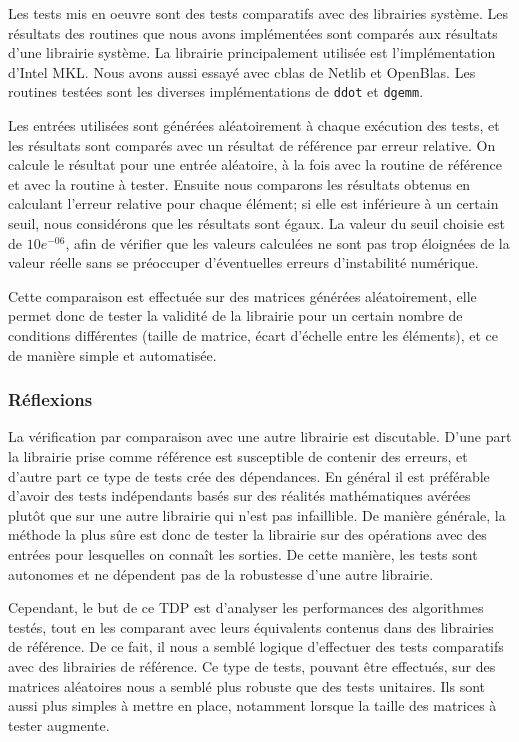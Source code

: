 Les tests mis en oeuvre sont des tests comparatifs avec des librairies système. Les résultats des routines que nous avons implémentées sont comparés aux résultats d'une librairie système. La librairie principalement utilisée est l'implémentation d'Intel \textsf{MKL}. Nous avons aussi essayé avec \textsf{cblas} de \textsf{Netlib} et \textsf{OpenBlas}. Les routines testées sont les diverses implémentations de \texttt{ddot} et \texttt{dgemm}. 

Les entrées utilisées sont générées aléatoirement à chaque exécution des tests, et les résultats sont comparés avec un résultat de référence par erreur relative. On calcule le résultat pour une entrée aléatoire, à la fois avec la routine de référence et avec la routine à tester. Ensuite nous comparons les résultats obtenus en calculant l'erreur relative pour chaque élément; si elle est inférieure à un certain seuil, nous considérons que les résultats sont égaux. La valeur du seuil choisie est de $10e^{-06}$, afin de vérifier que les valeurs calculées ne sont pas trop éloignées de la valeur réelle sans se préoccuper d'éventuelles erreurs d'instabilité numérique.

Cette comparaison est effectuée sur des matrices générées aléatoirement, elle permet donc de tester la validité de la librairie pour un certain nombre de conditions différentes (taille de matrice, écart d'échelle entre les éléments), et ce de manière simple et automatisée.

\subsubsection{Réflexions}
  
La vérification par comparaison avec une autre librairie est discutable. D'une part la librairie prise comme référence est susceptible de contenir des erreurs, et d'autre part ce type de tests crée des dépendances. En général il est préférable d'avoir des tests indépendants basés sur des réalités mathématiques avérées plutôt que sur une autre librairie qui n'est pas infaillible. De manière générale, la méthode la plus sûre est donc de tester la librairie sur des opérations avec des entrées pour lesquelles on connaît les sorties. De cette manière, les tests sont autonomes et ne dépendent pas de la robustesse d'une autre librairie. 

Cependant, le but de ce TDP est d'analyser les performances des algorithmes testés, tout en les comparant avec leurs équivalents contenus dans des librairies de référence. De ce fait, il nous a semblé logique d'effectuer des tests comparatifs avec des librairies de référence. Ce type de tests, pouvant être effectués, sur des matrices aléatoires nous a semblé plus robuste que des tests unitaires. Ils sont aussi plus simples à mettre en place, notamment lorsque la taille des matrices à tester augmente.

